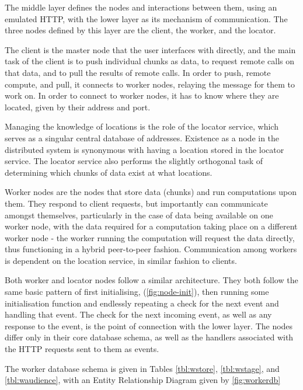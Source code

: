 The middle layer  defines the nodes and interactions between them, using an emulated HTTP, with the lower  layer as its mechanism of communication.
The three nodes defined by this layer are the client, the worker, and the locator.

The client is the master node that the user interfaces with directly, and the main task of the client is to push individual chunks as data, to request remote calls on that data, and to pull the results of remote calls.
In order to push, remote compute, and pull, it connects to worker nodes, relaying the message for them to work on.
In order to connect to worker nodes, it has to know where they are located, given by their address and port.

Managing the knowledge of locations is the role of the locator service, which serves as a singular central database of addresses.
Existence as a node in the distributed system is synonymous with having a location stored in the locator service.
The locator service also performs the slightly orthogonal task of determining which chunks of data exist at what locations.

Worker nodes are the nodes that store data (chunks) and run computations upon them.
They respond to client requests, but importantly can communicate amongst themselves, particularly in the case of data being available on one worker node, with the data required for a computation taking place on a different worker node - the worker running the computation will request the data directly, thus functioning in a hybrid peer-to-peer fashion.
Communication among workers is dependent on the location service, in similar fashion to clients.

Both worker and locator nodes follow a similar architecture.
They both follow the same basic pattern of first initialising, (\cref{fig:node-init}), then running some initialisation function and endlessly repeating a check for the next event and handling that event.
The check for the next incoming event, as well as any response to the event, is the point of connection with the lower \orcv layer.
The nodes differ only in their core database schema, as well as the handlers associated with the HTTP requests sent to them as events.

The worker database schema is given in Tables \cref{tbl:wstore}, \cref{tbl:wstage}, and \cref{tbl:waudience}, with an Entity Relationship Diagram given by \cref{fig:workerdb}


